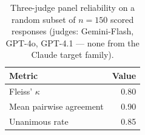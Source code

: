 \begin{table}[t]
\centering\small
\caption{Three-judge panel reliability on a random subset of $n{=}150$ scored responses (judges: Gemini-Flash, GPT-4o, GPT-4.1 --- none from the Claude target family).}
\label{tab:judges}
\begin{tabular}{lr}
\toprule
Metric & Value \\
\midrule
Fleiss' $\kappa$ & 0.80 \\
Mean pairwise agreement & 0.90 \\
Unanimous rate & 0.85 \\
\bottomrule
\end{tabular}
\end{table}

